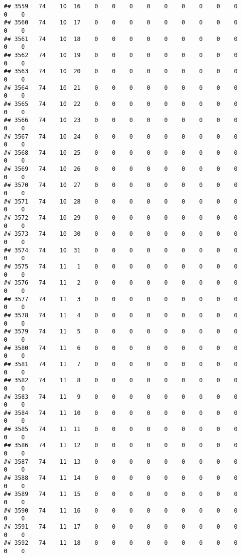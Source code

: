 \documentclass[]{article}
\begin{document}
\begin{verbatim}
## 3559   74    10  16    0    0    0    0    0    0    0    0    0    0    0
## 3560   74    10  17    0    0    0    0    0    0    0    0    0    0    0
## 3561   74    10  18    0    0    0    0    0    0    0    0    0    0    0
## 3562   74    10  19    0    0    0    0    0    0    0    0    0    0    0
## 3563   74    10  20    0    0    0    0    0    0    0    0    0    0    0
## 3564   74    10  21    0    0    0    0    0    0    0    0    0    0    0
## 3565   74    10  22    0    0    0    0    0    0    0    0    0    0    0
## 3566   74    10  23    0    0    0    0    0    0    0    0    0    0    0
## 3567   74    10  24    0    0    0    0    0    0    0    0    0    0    0
## 3568   74    10  25    0    0    0    0    0    0    0    0    0    0    0
## 3569   74    10  26    0    0    0    0    0    0    0    0    0    0    0
## 3570   74    10  27    0    0    0    0    0    0    0    0    0    0    0
## 3571   74    10  28    0    0    0    0    0    0    0    0    0    0    0
## 3572   74    10  29    0    0    0    0    0    0    0    0    0    0    0
## 3573   74    10  30    0    0    0    0    0    0    0    0    0    0    0
## 3574   74    10  31    0    0    0    0    0    0    0    0    0    0    0
## 3575   74    11   1    0    0    0    0    0    0    0    0    0    0    0
## 3576   74    11   2    0    0    0    0    0    0    0    0    0    0    0
## 3577   74    11   3    0    0    0    0    0    0    0    0    0    0    0
## 3578   74    11   4    0    0    0    0    0    0    0    0    0    0    0
## 3579   74    11   5    0    0    0    0    0    0    0    0    0    0    0
## 3580   74    11   6    0    0    0    0    0    0    0    0    0    0    0
## 3581   74    11   7    0    0    0    0    0    0    0    0    0    0    0
## 3582   74    11   8    0    0    0    0    0    0    0    0    0    0    0
## 3583   74    11   9    0    0    0    0    0    0    0    0    0    0    0
## 3584   74    11  10    0    0    0    0    0    0    0    0    0    0    0
## 3585   74    11  11    0    0    0    0    0    0    0    0    0    0    0
## 3586   74    11  12    0    0    0    0    0    0    0    0    0    0    0
## 3587   74    11  13    0    0    0    0    0    0    0    0    0    0    0
## 3588   74    11  14    0    0    0    0    0    0    0    0    0    0    0
## 3589   74    11  15    0    0    0    0    0    0    0    0    0    0    0
## 3590   74    11  16    0    0    0    0    0    0    0    0    0    0    0
## 3591   74    11  17    0    0    0    0    0    0    0    0    0    0    0
## 3592   74    11  18    0    0    0    0    0    0    0    0    0    0    0

\end{verbatim}
\end{document}
